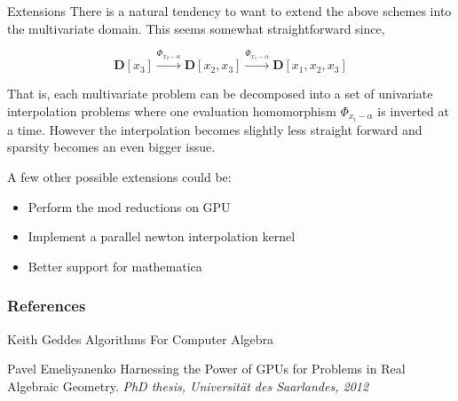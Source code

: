 \documentclass{beamer}
\begin{document}
	\begin{frame}{Extensions}
		There is a natural tendency to want to extend the above schemes into the multivariate domain. This seems somewhat straightforward since,
		
		$$ \mathbf{D}[x_3] \xrightarrow{\Phi_{x_2-\alpha}} \mathbf{D}[x_2,x_3] \xrightarrow{\Phi_{x_1-\alpha}} \mathbf{D}[x_1,x_2,x_3] $$
					
		That is, each multivariate problem can be decomposed into a set of univariate interpolation problems where one evaluation homomorphism $\Phi_{x_i-\alpha}$ is inverted at a time. However the interpolation becomes slightly less straight forward and sparsity becomes an even bigger issue.
		
		A few other possible extensions could be:
		\begin{itemize}
		\item Perform the mod reductions on GPU \\
		\item Implement a parallel newton interpolation kernel
		\item Better support for mathematica
		\end{itemize}		
		
				
		
	\end{frame}
	
	

	
	
	
	
	
	
	\begin{frame}
		\frametitle{References}
		\footnotesize{
			\begin{thebibliography}{99} %
				 Keith Geddes
				\newblock Algorithms For Computer Algebra
				
				 Pavel Emeliyanenko
				\newblock Harnessing the Power of GPUs for Problems in Real Algebraic Geometry.
				\newblock \emph{PhD thesis, Universität des Saarlandes, 2012} 
			\end{thebibliography}
		}
	\end{frame}
	
\end{document}
